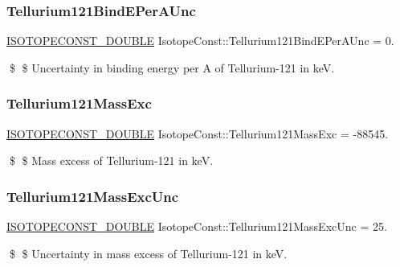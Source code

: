 \subsubsection{\texorpdfstring{Tellurium121\+Bind\+E\+Per\+A\+Unc}{Tellurium121BindEPerAUnc}}
{\footnotesize\ttfamily \mbox{\hyperlink{group___isotope_const-_macros_ga8f45a7272ce02c0b4c65c44636ed719a}{I\+S\+O\+T\+O\+P\+E\+C\+O\+N\+S\+T\+\_\+\+D\+O\+U\+B\+LE}} Isotope\+Const\+::\+Tellurium121\+Bind\+E\+Per\+A\+Unc = 0.}

\$ \$ Uncertainty in binding energy per A of Tellurium-\/121 in keV. \mbox{\label{group___isotope_const-_tellurium-_te121_ga5c412db4b0e97ef2ce386bb451e84194}} 
\subsubsection{\texorpdfstring{Tellurium121\+Mass\+Exc}{Tellurium121MassExc}}
{\footnotesize\ttfamily \mbox{\hyperlink{group___isotope_const-_macros_ga8f45a7272ce02c0b4c65c44636ed719a}{I\+S\+O\+T\+O\+P\+E\+C\+O\+N\+S\+T\+\_\+\+D\+O\+U\+B\+LE}} Isotope\+Const\+::\+Tellurium121\+Mass\+Exc = -\/88545.}

\$ \$ Mass excess of Tellurium-\/121 in keV. \mbox{\label{group___isotope_const-_tellurium-_te121_ga6386486f13406a229c0c25a98fd936c8}} 
\subsubsection{\texorpdfstring{Tellurium121\+Mass\+Exc\+Unc}{Tellurium121MassExcUnc}}
{\footnotesize\ttfamily \mbox{\hyperlink{group___isotope_const-_macros_ga8f45a7272ce02c0b4c65c44636ed719a}{I\+S\+O\+T\+O\+P\+E\+C\+O\+N\+S\+T\+\_\+\+D\+O\+U\+B\+LE}} Isotope\+Const\+::\+Tellurium121\+Mass\+Exc\+Unc = 25.}

\$ \$ Uncertainty in mass excess of Tellurium-\/121 in keV. \mbox{\label{group___isotope_const-_tellurium-_te121_ga8fa00503f9c9d3738cf830b85e46350e}} 
